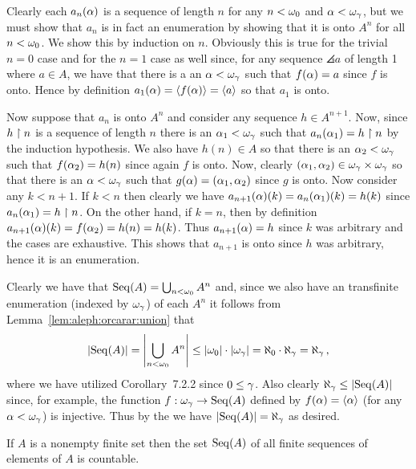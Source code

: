 {{    Clearly each $a_n(\alpha)$ is a sequence of length $n$ for any $n < \omega_0$ and $\alpha < \omega_\gamma$, but we must show that $a_n$ is in fact an enumeration by showing that it is onto $A^n$ for all $n < \omega_0$.
    We show this by induction on $n$.
    Obviously this is true for the trivial $n=0$ case and for the $n=1$ case as well since, for any sequence $\angles{a}$ of length 1 where $a \in A$, we have that there is a an $\alpha < \omega_\gamma$ such that $f(\alpha) = a$ since $f$ is onto.
    Hence by definition $a_1(\alpha) = \left\langle f(\alpha) \right\rangle = \left\langle a \right\rangle$ so that $a_1$ is onto.

    Now suppose that $a_n$ is onto $A^n$ and consider any sequence $h \in A^{n+1}$.
    Now, since $h \restriction n$ is a sequence of length $n$ there is an $\alpha_1 < \omega_\gamma$ such that $a_n(\alpha_1) = h \restriction n$ by the induction hypothesis.
    We also have $h(n) \in A$ so that there is an $\alpha_2 < \omega_\gamma$ such that $f(\alpha_2) = h(n)$ since again $f$ is onto.
    Now, clearly $(\alpha_1, \alpha_2) \in \omega_\gamma \times \omega_\gamma$ so that there is an $\alpha < \omega_\gamma$ such that $g(\alpha) = (\alpha_1, \alpha_2)$ since $g$ is onto.
    Now consider any $k < n+1$.
    If $k < n$ then clearly we have $a_{n+1}(\alpha)(k) = a_n(\alpha_1)(k) = h(k)$ since $a_n(\alpha_1) = h \restriction n$.
    On the other hand, if $k = n$, then by definition $a_{n+1}(\alpha)(k) = f(\alpha_2) = h(n) = h(k)$.
    Thus $a_{n+1}(\alpha) = h$ since $k$ was arbitrary and the cases are exhaustive.
    This shows that $a_{n+1}$ is onto since $h$ was arbitrary, hence it is an enumeration.

    Clearly we have that $\mathrm{Seq}(A) = \bigcup_{n < \omega_0} A^n$ and, since we also have an transfinite enumeration (indexed by $\omega_\gamma$) of each $A^n$ it follows from Lemma~\ref{lem:aleph:orcarar:union} that
    $$
    \left| \mathrm{Seq}(A) \right| = \left| \bigcup_{n < \omega_0} A^n \right| \leq \left| \omega_0 \right| \cdot \left| \omega_\gamma \right| = \aleph_0 \cdot \aleph_\gamma = \aleph_\gamma \,,
    $$
    where we have utilized Corollary~7.2.2 since $0 \leq \gamma$.
    Also clearly $\aleph_\gamma \leq \left| \mathrm{Seq}(A) \right|$ since, for example, the function $f: \omega_\gamma \to \mathrm{Seq}(A)$ defined by $f(\alpha) = \left\langle \alpha \right\rangle$ (for any $\alpha < \omega_\gamma$) is injective.
    Thus by the \cbthrm{} we have $\left| \mathrm{Seq}(A) \right| = \aleph_\gamma$ as desired.
  }

  \begin{cor}\label{cor:aleph:orcarar:seqfin}
    If $A$ is a nonempty finite set then the set $\mathrm{Seq}(A)$ of all finite sequences of elements of $A$ is countable.
  \end{cor}
  }
